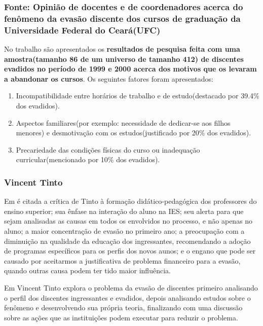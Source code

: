 \documentclass{report}
\begin{document}
\subsubsection{Fonte: Opinião de docentes e de coordenadores acerca do fenômeno da evasão discente dos cursos de graduação da Universidade Federal do Ceará(UFC)}

No trabalho \cite{andriola} são apresentados os \textbf{resultados de pesquisa feita com uma amostra(tamanho 86 de um universo de tamanho 412) de discentes evadidos no período de 1999 e 2000 acerca dos motivos que os levaram a abandonar os cursos}. Os seguintes fatores foram apresentados:

\begin{enumerate}

\item Incompatibilidade entre horários de trabalho e de estudo(destacado por 39.4\% dos evadidos).

\item Aspectos familiares(por exemplo: necessidade de dedicar-se aos filhos menores) e desmotivação com os estudos(justificado por 20\% dos evadidos).

\item Precariedade das condições físicas do curso ou inadequação curricular(mencionado por 10\% dos evadidos).

\end{enumerate}


\subsubsection{Vincent Tinto}

Em \cite{evasao_panorama2} é citada a crítica de Tinto à formação didático-pedagógica dos professores do ensino superior; sua ênfase na interação do aluno na IES; seu alerta para que sejam analisadas as causas em todos os envolvidos no processo, e não apenas no aluno; a maior concentração de evasão no primeiro ano; a preocupação com a diminuição na qualidade da educação dos ingressantes, recomendando a adoção de programas específicos para os perfis dos novos aunos; e o engano que pode ser causado por aceitarmos a justificativa de problema financeiro para a evasão, quando outras causa podem ter tido maior influência.

Em \cite{tinto_leaving} Vincent Tinto explora o problema da evasão de discentes primeiro analisando o perfil dos discentes ingressantes e evadidos, depois analisando estudos sobre o fenômeno e desenvolvendo sua própria teoria, finalizando com uma discussão sobre as ações que as instituições podem executar para reduzir o problema.
\end{document}
